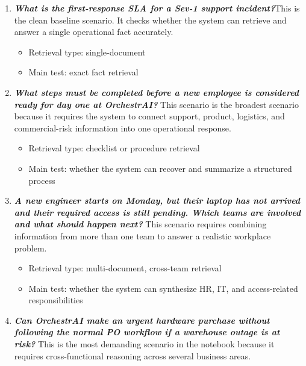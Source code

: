 \begin{enumerate}
    \item \textbf{\textit{What is the first-response SLA for a Sev-1 support incident?}}\newline This is the clean baseline scenario. It checks whether the system can retrieve and answer a single operational fact accurately.
        \begin{itemize}
            \item Retrieval type: single-document
            \item Main test: exact fact retrieval
        \end{itemize}
    \item \textbf{\textit{What steps must be completed before a new employee is considered ready for day one at OrchestrAI?}}\newline
    This scenario is the broadest scenario because it requires the system to connect support, product, logistics, and commercial-risk information into one operational response.
        \begin{itemize}
            \item Retrieval type: checklist or procedure retrieval
            \item Main test: whether the system can recover and summarize a structured process
        \end{itemize}
     \item \textbf{\textit{A new engineer starts on Monday, but their laptop has not arrived and their required access is still pending. Which teams are involved and what should happen next?}}\newline
     This scenario requires combining information from more than one team to answer a realistic workplace problem.
        \begin{itemize}
            \item Retrieval type: multi-document, cross-team retrieval
            \item Main test: whether the system can synthesize HR, IT, and access-related responsibilities
        \end{itemize}
     \item \textbf{\textit{Can OrchestrAI make an urgent hardware purchase without following the normal PO workflow if a warehouse outage is at risk?}}\newline
     This is the most demanding scenario in the notebook because it requires cross-functional reasoning across several business areas.
        \begin{itemize}

\end{itemize}
\end{enumerate}
